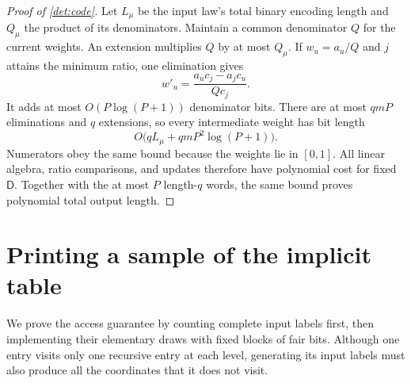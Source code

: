 \documentclass[11pt]{article} \usepackage[utf8]{inputenc}
\theoremstyle{plain} \newtheorem{theorem}{Theorem}[section]
\theoremstyle{definition} \newaliascnt{definition}{theorem}
\begin{document}
\begin{proof}[Proof of \cref{det:code}]
Let $L_\mu$ be the input law's total binary encoding length and $Q_\mu$ the
product of its denominators. Maintain a common denominator $Q$ for the current
weights. An extension multiplies $Q$ by at most $Q_\mu$. If $w_u=a_u/Q$
and $j$ attains the minimum ratio, one elimination gives
\[
w'_u=\frac{a_uc_j-a_jc_u}{Qc_j}.
\]
It adds at most $O(P\log(P+1))$ denominator bits. There are at most $qmP$
eliminations and $q$ extensions, so every intermediate weight has bit length
\[
O\bigl(qL_\mu+qmP^2\log(P+1)\bigr).
\]
Numerators obey the same bound because the weights lie in $[0,1]$.
All linear algebra, ratio comparisons, and updates therefore have polynomial
cost for fixed $\mathsf D$. Together with the at most $P$ length-$q$ words,
the same bound proves polynomial total output length.
\end{proof}

\section{Printing a sample of the implicit table}\label{sec:sampling-algorithm}
\label{app:implementation}

We prove the access guarantee by counting complete input labels first, then
implementing their elementary draws with fixed blocks of fair bits. Although
one entry visits only one recursive entry at each level, generating its input
labels must also produce all the coordinates that it does not visit.
\end{document}
